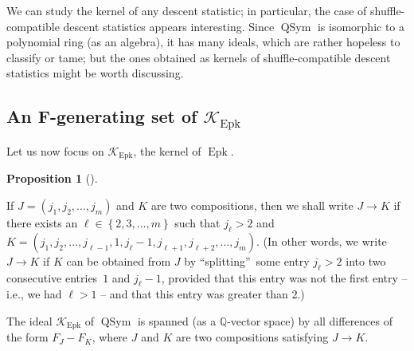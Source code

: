 \documentclass[numbers=enddot,12pt,final,onecolumn,notitlepage]{scrartcl}%
\theoremstyle{definition}
\newtheorem{prop}[theo]{Proposition}
\newenvironment{proposition}[1][]
{\begin{prop}[#1]\begin{leftbar}}
{\end{leftbar}\end{prop}}
\begin{document}
We can study the kernel of any descent statistic; in particular, the case of
shuffle-compatible descent statistics appears interesting. Since
$\operatorname*{QSym}$ is isomorphic to a polynomial ring (as an algebra), it
has many ideals, which are rather hopeless to classify or tame; but the ones
obtained as kernels of shuffle-compatible descent statistics might be worth discussing.

\subsection{An F-generating set of $\mathcal{K}_{\operatorname*{Epk}}$}

Let us now focus on $\mathcal{K}_{\operatorname*{Epk}}$, the kernel of
$\operatorname*{Epk}$.

\begin{proposition}
\label{prop.K.Epk.F}If $J=\left(  j_{1},j_{2},\ldots,j_{m}\right)  $ and $K$
are two compositions, then we shall write $J\rightarrow K$ if there exists an
$\ell\in\left\{  2,3,\ldots,m\right\}  $ such that $j_{\ell}>2$ and $K=\left(
j_{1},j_{2},\ldots,j_{\ell-1},1,j_{\ell}-1,j_{\ell+1},j_{\ell+2},\ldots
,j_{m}\right)  $. (In other words, we write $J\rightarrow K$ if $K$ can be
obtained from $J$ by \textquotedblleft splitting\textquotedblright\ some entry
$j_{\ell}>2$ into two consecutive entries\footnotemark\ $1$ and $j_{\ell}-1$,
provided that this entry was not the first entry -- i.e., we had $\ell>1$ --
and that this entry was greater than $2$.)

The ideal $\mathcal{K}_{\operatorname*{Epk}}$ of $\operatorname*{QSym}$ is
spanned (as a $\mathbb{Q}$-vector space) by all differences of the form
$F_{J}-F_{K}$, where $J$ and $K$ are two compositions satisfying $J\rightarrow
K$.
\end{proposition}

\end{document}

